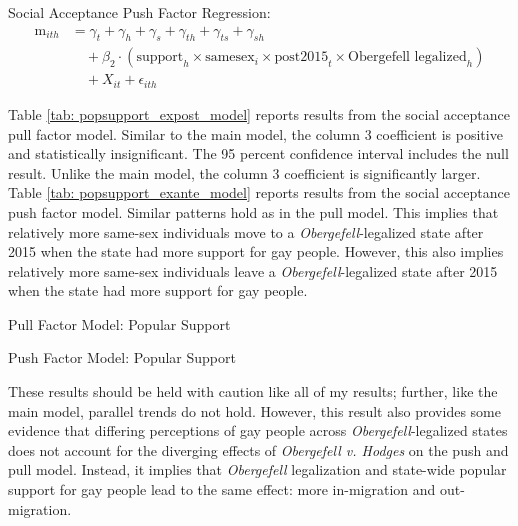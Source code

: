\documentclass[12pt,letterpaper]{article}
\begin{document}
\hfill
\break
Social Acceptance Push Factor Regression:
\begin{equation}
\begin{aligned}
\text{m}_{ith} &= \gamma_t + \gamma_h + \gamma_s + \gamma_{th} + \gamma_{ts} + \gamma_{sh} \\
&\quad + \beta_2 \cdot (\text{support}_h \times \text{samesex}_i \times \text{post2015}_t \times \text{Obergefell legalized}_h) \\
&\quad + X_{it} + \epsilon_{ith}
\end{aligned}
\end{equation}

Table \ref{tab: popsupport_expost_model} reports results from the social acceptance pull factor model. Similar to the main model, the column 3 coefficient is positive and statistically insignificant. The 95 percent confidence interval includes the null result. Unlike the main model, the column 3 coefficient is significantly larger. Table \ref{tab: popsupport_exante_model} reports results from the social acceptance push factor model. Similar patterns hold as in the pull model. This implies that relatively more same-sex individuals move to a \textit{Obergefell}-legalized state after 2015 when the state had more support for gay people. However, this also implies relatively more same-sex individuals leave a \textit{Obergefell}-legalized state after 2015 when the state had more support for gay people. 

\begin{table}[htbp] %
    \centering
    \caption{Pull Factor Model: Popular Support}
    \label{tab: popsupport_expost_model}
    
\end{table}
\begin{table}[htbp]
    \centering
    \caption{Push Factor Model: Popular Support}
    \label{tab: popsupport_exante_model}
    
\end{table}

These results should be held with caution like all of my results; further, like the main model, parallel trends do not hold. However, this result also provides some evidence that differing perceptions of gay people across \textit{Obergefell}-legalized states does not account for the diverging effects of \textit{Obergefell v. Hodges} on the push and pull model. Instead, it implies that \textit{Obergefell} legalization and state-wide popular support for gay people lead to the same effect: more in-migration and out-migration.
\end{document}
